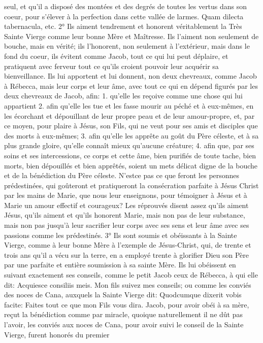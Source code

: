 seul, et qu'il a disposé des montées et des degrés de toutes les vertus dans son coeur, pour s'élever à la
perfection dans cette vallée de larmes. Quam dilecta tabernacula, etc.
 2° Ils aiment tendrement et honorent véritablement la Très Sainte Vierge comme leur bonne Mère et
Maîtresse. Ils l'aiment non seulement de bouche, mais en vérité; ils l'honorent, non seulement à l'extérieur, mais
dans le fond du coeur, ils évitent comme Jacob, tout ce qui lui peut déplaire, et pratiquent avec ferveur tout ce
qu'ils croient pouvoir leur acquérir sa bienveillance. Ils lui apportent et lui donnent, non deux chevreaux, comme
Jacob à Rébecca, mais leur corps et leur âme, avec tout ce qui en dépend figurés par les deux chevreaux de
Jacob, afin: 1. qu'elle les reçoive comme une chose qui lui appartient 2. afin qu'elle les tue et les fasse mourir au
péché et à eux-mêmes, en les écorchant et dépouillant de leur propre peau et de leur amour-propre, et, par ce
moyen, pour plaire à Jésus, son Fils, qui ne veut pour ses amis et disciples que des morts à eux-mêmes; 3. afin
qu'elle les apprête au goût du Père céleste, et à sa plus grande gloire, qu'elle connaît mieux qu'aucune créature; 4.
afin que, par ses soins et ses intercessions, ce corps et cette âme, bien purifiés de toute tache, bien morts, bien
dépouillés et bien apprêtés, soient un mets délicat digne de la bouche et de la bénédiction du Père céleste. N'estce pas ce que feront les personnes prédestinées, qui goûteront et pratiqueront la consécration parfaite à Jésus Christ par les mains de Marie, que nous leur enseignons, pour témoigner à Jésus et à Marie un amour effectif et
courageux?
Les réprouvés disent assez qu'ils aiment Jésus, qu'ils aiment et qu'ils honorent Marie, mais non pas de leur
substance, mais non pas jusqu'à leur sacrifier leur corps avec ses sens et leur âme avec ses passions comme les
prédestinés.
 3° Ils sont soumis et obéissants à la Sainte Vierge, comme à leur bonne Mère à l'exemple de Jésus-Christ,
qui, de trente et trois ans qu'il a vécu sur la terre, en a employé trente à glorifier Dieu son Père par une parfaite et
entière soumission à sa sainte Mère. Ils lui obéissent en suivant exactement ses conseils, comme le petit Jacob
ceux de Rébecca, à qui elle dit: Acquiesce consiliis meis. Mon fils suivez mes conseils; ou comme les conviés des
noces de Cana, auxquels la Sainte Vierge dit: Quodcumque dixerit vobis facite: Faites tout ce que mon Fils vous
dira. Jacob, pour avoir obéi à sa mère, reçut la bénédiction comme par miracle, quoique naturellement il ne dût pas
l'avoir, les conviés aux noces de Cana, pour avoir suivi le conseil de la Sainte Vierge, furent honorés du premier
